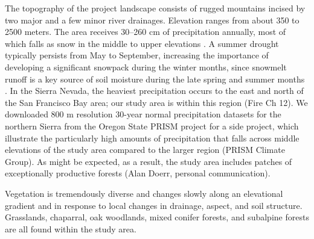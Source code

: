 The topography of the project landscape consists of rugged mountains incised by two major and a few minor river drainages. Elevation ranges from about 350 to 2500 meters. The area receives 30--260 cm of precipitation annually, most of which falls as snow in the middle to upper elevations \citep{Storer1963}. A summer drought typically persists from May to September, increasing the importance of developing a significant snowpack during the winter months, since snowmelt runoff is a key source of soil moisture during the late spring and summer months \citep{Minnich2007}. In the Sierra Nevada, the heaviest precipitation occurs to the east and north of the San Francisco Bay area; our study area is within this region (Fire Ch 12). We downloaded 800 m resolution 30-year normal precipitation datasets for the northern Sierra from the Oregon State PRISM project for a side project, which illustrate the particularly high amounts of precipitation that falls across middle elevations of the study area compared to the larger region (PRISM Climate Group). As might be expected, as a result, the study area includes patches of exceptionally productive forests (Alan Doerr, personal communication). 

Vegetation is tremendously diverse and changes slowly along an elevational gradient and in response to local changes in drainage, aspect, and soil structure. Grasslands, chaparral, oak woodlands, mixed conifer forests, and subalpine forests are all found within the study area. %

